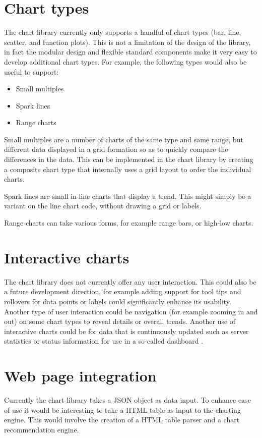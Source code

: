 \section{Chart types}
The chart library currently only supports a handful of chart types (bar, line, scatter, and function plots). This is not a limitation of the design of the library, in fact the modular design and flexible standard components make it very easy to develop additional chart types. For example, the following types would also be useful to support:
\begin{itemize}
\item Small multiples
\item Spark lines
\item Range charts
\end{itemize}

Small multiples\cite{tufte01} are a number of charts of the same type and same range, but different data displayed in a grid formation so as to quickly compare the differences in the data. This can be implemented in the chart library by creating a composite chart type that internally uses a grid layout to order the individual charts. 

Spark lines\cite{tufte06} are small in-line charts that display a trend. This might simply be a variant on the line chart code, without drawing a grid or labels.

Range charts can take various forms, for example range bars, or high-low charts. 

\section{Interactive charts}
The chart library does not currently offer any user interaction. This could also be a future development direction, for example adding support for tool tips and rollovers for data points or labels could significantly enhance its usability. Another type of user interaction could be navigation (for example zooming in and out) on some chart types to reveal details or overall trends. Another use of interactive charts could be for data that is continuously updated such as server statistics or status information for use in a so-called dashboard \cite{few06}.

\section{Web page integration}
Currently the chart library takes a JSON object as data input. To enhance ease of use it would be interesting to take a HTML table as input to the charting engine. This would involve the creation of a HTML table parser and a chart recommendation engine. 

